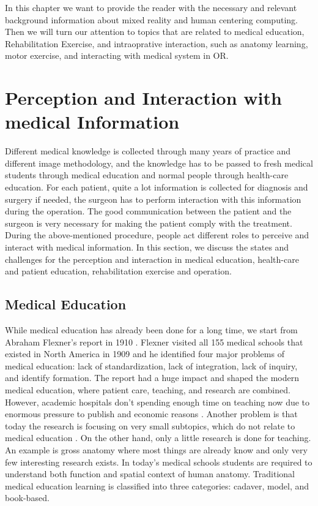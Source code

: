 In this chapter we want to provide the reader with the necessary and relevant background information about mixed reality and human centering computing. Then we will turn our attention to topics that are related to medical education, Rehabilitation Exercise, and intraoprative interaction, such as anatomy learning, motor exercise, and interacting with medical system in OR. 

\section{Perception and Interaction with medical Information}
Different medical knowledge is collected through many years of practice and different image methodology, and the knowledge has to be passed to fresh medical students through medical education and normal people through health-care education. For each patient, quite a lot information is collected for diagnosis and surgery if needed, the surgeon has to perform interaction with this information during the operation. The good communication between the patient and the surgeon is very necessary for making the patient comply with the treatment. During the above-mentioned procedure, people act different roles to perceive and interact with medical information. In this section, we discuss the states and challenges for the perception and interaction in medical education, health-care and patient education, rehabilitation exercise and operation.

\subsection{Medical Education}
While medical education has already been done for a long time, we start from Abraham Flexner's report in 1910 \citep{Flexner1910}. Flexner visited all 155 medical schools that existed in North America in 1909 and he identified four major problems of medical education: lack of standardization, lack of integration, lack of inquiry, and identify formation. The report had a huge impact and shaped the modern medical education, where patient care, teaching, and research are combined. However, academic hospitals don't spending enough time on teaching now due to enormous pressure to publish and economic reasons \cite{Saidi2007}. Another problem is that today the research is focusing on very small subtopics, which do not relate to medical education \cite{Ludmerer2003}. On the other hand, only a little research is done for teaching. An example is gross anatomy where most things are already know and only very few interesting research exists.
In today's medical schools students are required to understand both function and spatial context of human anatomy. Traditional medical education learning is classified into three categories: cadaver, model, and book-based.

